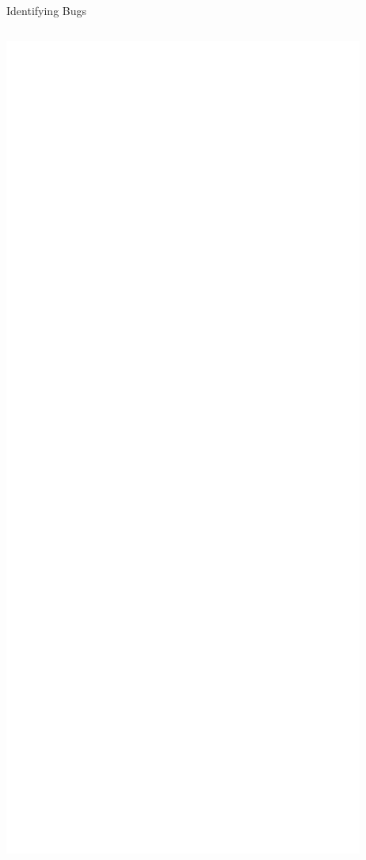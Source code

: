 \documentclass[xcolor=dvipsnames]{beamer}
\begin{document}
\begin{frame}[fragile]{Identifying Bugs}
\begin{columns}[l]
		\includegraphics[width=\textwidth]{blank-livelock.png}
	\end{columns}
\end{frame}
\end{document}
